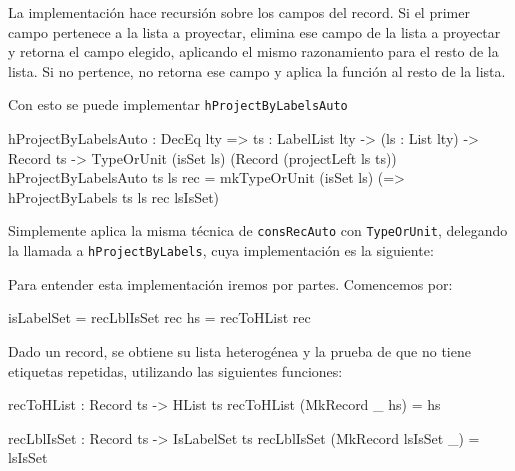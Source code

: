 La implementación hace recursión sobre los campos del record. Si el primer campo pertenece a la lista a proyectar, elimina ese campo de la lista a proyectar y retorna el campo elegido, aplicando el mismo razonamiento para el resto de la lista. Si no pertence, no retorna ese campo y aplica la función al resto de la lista.

Con esto se puede implementar \texttt{hProjectByLabelsAuto}

\begin{code}
hProjectByLabelsAuto : DecEq lty => {ts : LabelList lty} ->
  (ls : List lty) -> Record ts ->
  TypeOrUnit (isSet ls) (Record (projectLeft ls ts))
hProjectByLabelsAuto {ts} ls rec =
  mkTypeOrUnit (isSet ls) (\lsIsSet =>
    hProjectByLabels {ts} ls rec lsIsSet)
\end{code}

Simplemente aplica la misma técnica de \texttt{consRecAuto} con \texttt{TypeOrUnit}, delegando la llamada a \texttt{hProjectByLabels}, cuya implementación es la siguiente:


Para entender esta implementación iremos por partes. Comencemos por:

\begin{code}
isLabelSet = recLblIsSet rec
hs = recToHList rec
\end{code}

Dado un record, se obtiene su lista heterogénea y la prueba de que no tiene etiquetas repetidas, utilizando las siguientes funciones:

\begin{code}
recToHList : Record ts -> HList ts
recToHList (MkRecord _ hs) = hs

recLblIsSet : Record ts -> IsLabelSet ts
recLblIsSet (MkRecord lsIsSet _) = lsIsSet
\end{code}

